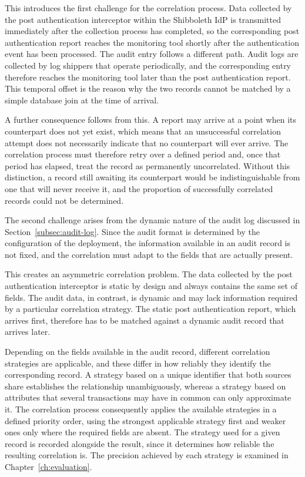 \documentclass[../main.tex]{subfiles}
\begin{document}
This introduces the first challenge for the correlation process. 
Data collected by the post authentication interceptor within the Shibboleth IdP is transmitted 
immediately after the collection process has completed, so the corresponding post authentication 
report reaches the monitoring tool shortly after the authentication event has been processed. 
The audit entry follows a different path. 
Audit logs are collected by log shippers that operate periodically, and the corresponding entry 
therefore reaches the monitoring tool later than the post authentication report. 
This temporal offset is the reason why the two records cannot be matched by a simple database 
join at the time of arrival.

A further consequence follows from this. 
A report may arrive at a point when its counterpart does not yet exist, which means that an 
unsuccessful correlation attempt does not necessarily indicate that no counterpart will ever 
arrive. 
The correlation process must therefore retry over a defined period and, once that period has 
elapsed, treat the record as permanently uncorrelated. 
Without this distinction, a record still awaiting its counterpart would be indistinguishable 
from one that will never receive it, and the proportion of successfully correlated records 
could not be determined.

The second challenge arises from the dynamic nature of the audit log discussed in 
Section~\ref{subsec:audit-log}. 
Since the audit format is determined by the configuration of the deployment, the information 
available in an audit record is not fixed, and the correlation must adapt to the fields that 
are actually present.

This creates an asymmetric correlation problem. 
The data collected by the post authentication interceptor is static by design and always 
contains the same set of fields. 
The audit data, in contrast, is dynamic and may lack information required by a particular 
correlation strategy. 
The static post authentication report, which arrives first, therefore has to be matched against a 
dynamic audit record that arrives later.

Depending on the fields available in the audit record, different correlation strategies are 
applicable, and these differ in how reliably they identify the corresponding record. 
A strategy based on a unique identifier that both sources share establishes the relationship 
unambiguously, whereas a strategy based on attributes that several transactions may have in 
common can only approximate it. 
The correlation process consequently applies the available strategies in a defined priority 
order, using the strongest applicable strategy first and weaker ones only where the required 
fields are absent. 
The strategy used for a given record is recorded alongside the result, since it determines how 
reliable the resulting correlation is. 
The precision achieved by each strategy is examined in Chapter~\ref{ch:evaluation}.
\end{document}
